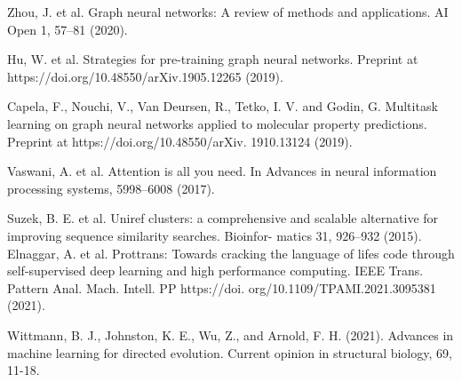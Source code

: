 \documentclass[12pt]{article}
\begin{document}
\begin{thebibliography}{20}
 Zhou, J. et al. Graph neural networks: A review of methods and applications. AI Open 1, 57–81 (2020).

 Hu, W. et al. Strategies for pre-training graph neural networks. Preprint at https://doi.org/10.48550/arXiv.1905.12265 (2019). 



 Capela, F., Nouchi, V., Van Deursen, R., Tetko, I. V. and  Godin, G. Multitask learning on graph neural networks applied to molecular property predictions. Preprint at https://doi.org/10.48550/arXiv. 1910.13124 (2019).

  Vaswani, A. et al. Attention is all you need. In Advances in neural information processing systems, 5998–6008 (2017).

 Suzek, B. E. et al. Uniref clusters: a comprehensive and scalable alternative for improving sequence similarity searches. Bioinfor- matics 31, 926–932 (2015).
 Elnaggar, A. et al. Prottrans: Towards cracking the language of lifes code through self-supervised deep learning and high performance computing. IEEE Trans. Pattern Anal. Mach. Intell. PP https://doi. org/10.1109/TPAMI.2021.3095381 (2021).


 Wittmann, B. J., Johnston, K. E., Wu, Z., and  Arnold, F. H. (2021). Advances in machine learning for directed evolution. Current opinion in structural biology, 69, 11-18.
\end{thebibliography}
\end{document}
